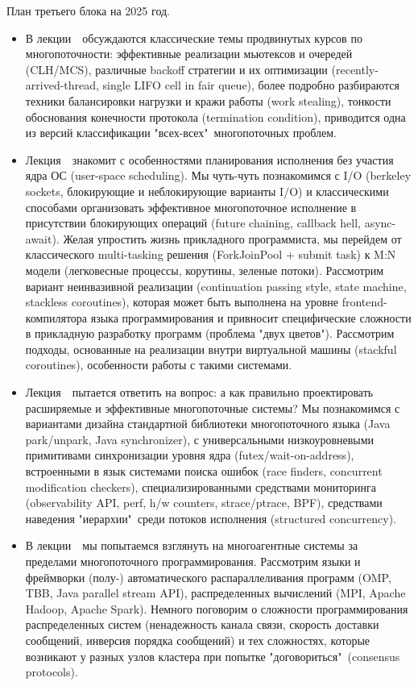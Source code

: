 \documentclass[a4paper, 12pt]{extarticle}
\begin{document}
План третьего блока на 2025 год.
\begin{itemize}
\item В лекции~\advancedConcurrencyNum~обсуждаются классические темы продвинутых курсов по многопоточности: эффективные реализации мьютексов и очередей (CLH/MCS), различные backoff стратегии и их оптимизации (recently-arrived-thread, single LIFO cell in fair queue), более подробно разбираются техники балансировки нагрузки и кражи работы (work stealing), тонкости обоснования конечности протокола (termination condition), приводится одна из версий классификации "всех-всех"\ многопоточных проблем.

\item Лекция~\userSpaceThreadingNum~знакомит с особенностями планирования исполнения без участия ядра ОС (user-space scheduling). Мы чуть-чуть познакомимся с I/O (berkeley sockets, блокирующие и неблокирующие варианты I/O) и классическими способами организовать эффективное многопоточное исполнение в присутствии блокирующих операций (future chaining, callback hell, async-await). Желая упростить жизнь прикладного программиста, мы перейдем от классического multi-tasking решения (ForkJoinPool + submit task) к M:N модели (легковесные процессы, корутины, зеленые потоки). Рассмотрим вариант неинвазивной реализации (continuation passing style, state machine, stackless coroutines), которая может быть выполнена на уровне frontend-компилятора языка программирования и привносит специфические сложности в прикладную разработку программ (проблема "двух цветов"). Рассмотрим подходы, основанные на реализации внутри виртуальной машины (stackful coroutines), особенности работы с такими системами. 

\item Лекция~\designNum~пытается ответить на вопрос: а как правильно проектировать расширяемые и эффективные многопоточные системы? Мы познакомимся с вариантами дизайна стандартной библиотеки многопоточного языка (Java park/unpark, Java synchronizer), с универсальными низкоуровневыми примитивами синхронизации уровня ядра (futex/wait-on-address), встроенными в язык системами поиска ошибок (race finders, concurrent modification checkers), специализированными средствами мониторинга (observability API, perf, h/w counters, strace/ptrace, BPF), средствами наведения "иерархии"\ среди потоков исполнения (structured concurrency). 

\item В лекции~\frameworksAndDistributedNum~мы попытаемся взглянуть на многоагентные системы за пределами многопоточного программирования. Рассмотрим языки и фреймворки (полу-) автоматического распараллеливания программ (OMP, TBB, Java parallel stream API), распределенных вычислений (MPI, Apache Hadoop, Apache Spark). Немного поговорим о сложности программирования распределенных систем (ненадежность канала связи, скорость доставки сообщений, инверсия порядка сообщений) и тех сложностях, которые возникают у разных узлов кластера при попытке "договориться"\ (consensus protocols).

\end{itemize}
\end{document}
